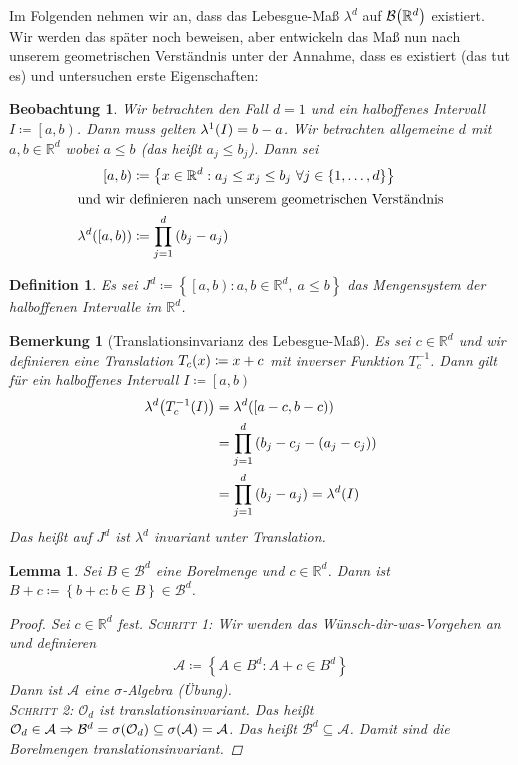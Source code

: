 \documentclass[11pt, twoside, a4paper]{article}
\theoremstyle{plain}
\newtheorem{bemerkung}[blockelement]{Bemerkung}
\newtheorem{definition}[blockelement]{Definition}
\newtheorem{lemma}[blockelement]{Lemma}
\newtheorem{beobachtung}[blockelement]{Beobachtung}
\numberwithin{equation}{subsection}
\newcommand{\set}[1]{\left\{#1\right\}}
\newcommand{\pair}[1]{\left(#1\right)}
\newcommand{\of}[1]{\mathopen{}\mathclose{}\bgroup\left(#1\aftergroup\egroup\right)}
\newcommand{\linterv}[1]{\left[#1\right)}
\newcommand{\impl}[0]{\Rightarrow{}}
\newcommand{\anf}[1]{\glqq{}#1\grqq}
\newcommand{\R}{\mathbb{R}}
\newcommand{\mA}{\mathcal{A}}
\newcommand{\mB}{\mathcal{B}}
\newcommand{\mO}{\mathcal{O}}
\begin{document}
    Im Folgenden nehmen wir an, dass das Lebesgue-Maß $\lambda^d$ auf $\mB\of{\R^d}$ existiert. Wir werden das später noch beweisen, aber entwickeln das Maß nun nach unserem geometrischen Verständnis unter der Annahme, dass es existiert (das tut es) und untersuchen erste Eigenschaften:

    \begin{beobachtung}
        Wir betrachten den Fall $d=1$ und ein halboffenes Intervall $I\coloneqq \linterv{a,b}$. Dann muss gelten $\lambda^1\of{I} = b-a$. Wir betrachten allgemeine $d$ mit $a,b\in\R^d$ wobei $a\leq b$ (das heißt $a_j \leq b_j$). Dann sei
        \begin{align*}
            \linterv{a,b} &\coloneqq \set{x\in\R^d: a_j \leq x_j \leq b_j~\forall j\in\set{1,\ldots, d}}\\
            \intertext{und wir definieren nach unserem geometrischen Verständnis}
            \lambda^d\of{\linterv{a,b}} &\coloneqq \prod_{j=1}^{d} \pair{b_j - a_j}
        \end{align*}
    \end{beobachtung}

    \begin{definition}
        Es sei $J^d \coloneqq \set{\linterv{a,b}: a,b\in\R^d,~a\leq b}$ das Mengensystem der halboffenen Intervalle im $\R^d$.
    \end{definition}

    \begin{bemerkung}[Translationsinvarianz des Lebesgue-Maß]
        Es sei $c\in\R^d$ und wir definieren eine Translation $T_c\of{x} \coloneqq x+c$ mit inverser Funktion $T_c^{-1}$. Dann gilt für ein halboffenes Intervall $I \coloneqq \linterv{a,b}$
        \begin{align*}
            \lambda^d\of{T_c^{-1}\of{I}} &= \lambda^d\of{\linterv{a-c, b-c}}\\
            &= \prod_{j=1}^{d} \pair{b_j - c_j - \pair{a_j - c_j}}\\
            &= \prod_{j=1}^{d} \pair{b_j - a_j} = \lambda^d\of{I}
        \end{align*}
        Das heißt auf $J^d$ ist $\lambda^d$ invariant unter Translation.
    \end{bemerkung}

    \begin{lemma}
        Sei $B \in\mB^d$ eine Borelmenge und $c\in\R^d$. Dann ist $B + c \coloneqq\set{b+c: b\in B} \in\mB^d$.
        \begin{proof}
            Sei $c\in\R^d$ fest. \textsc{Schritt 1}: Wir wenden das \anf{Wünsch-dir-was}-Vorgehen an und definieren
            \begin{align*}
                \mA \coloneqq \set{A \in B^d: A + c \in B^d}
            \end{align*}
            Dann ist $\mA$ eine $\sigma$-Algebra (Übung).\\
            \textsc{Schritt 2}: $\mO_d$ ist translationsinvariant. Das heißt $\mO_d \in \mA \impl \mB^d = \sigma\of{\mO_d} \subseteq \sigma\of{\mA} = \mA$. Das heißt $\mB^d \subseteq \mA$. Damit sind die Borelmengen translationsinvariant.
        \end{proof}
    \end{lemma}
\end{document}
